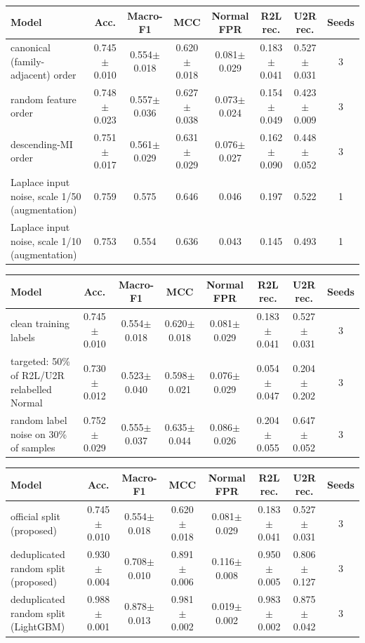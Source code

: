 \begin{tabular}{lccccccc}
\toprule
Model & Acc. & Macro-F1 & MCC & Normal FPR & R2L rec. & U2R rec. & Seeds \\
\midrule
canonical (family-adjacent) order & 0.745$\pm$0.010 & 0.554$\pm$0.018 & 0.620$\pm$0.018 & 0.081$\pm$0.029 & 0.183$\pm$0.041 & 0.527$\pm$0.031 & 3 \\
random feature order & 0.748$\pm$0.023 & 0.557$\pm$0.036 & 0.627$\pm$0.038 & 0.073$\pm$0.024 & 0.154$\pm$0.049 & 0.423$\pm$0.009 & 3 \\
descending-MI order & 0.751$\pm$0.017 & 0.561$\pm$0.029 & 0.631$\pm$0.029 & 0.076$\pm$0.027 & 0.162$\pm$0.090 & 0.448$\pm$0.052 & 3 \\
Laplace input noise, scale 1/50 (augmentation) & 0.759 & 0.575 & 0.646 & 0.046 & 0.197 & 0.522 & 1 \\
Laplace input noise, scale 1/10 (augmentation) & 0.753 & 0.554 & 0.636 & 0.043 & 0.145 & 0.493 & 1 \\
\bottomrule
\end{tabular}

\begin{tabular}{lccccccc}
\toprule
Model & Acc. & Macro-F1 & MCC & Normal FPR & R2L rec. & U2R rec. & Seeds \\
\midrule
clean training labels & 0.745$\pm$0.010 & 0.554$\pm$0.018 & 0.620$\pm$0.018 & 0.081$\pm$0.029 & 0.183$\pm$0.041 & 0.527$\pm$0.031 & 3 \\
targeted: 50\% of R2L/U2R relabelled Normal & 0.730$\pm$0.012 & 0.523$\pm$0.040 & 0.598$\pm$0.021 & 0.076$\pm$0.029 & 0.054$\pm$0.047 & 0.204$\pm$0.202 & 3 \\
random label noise on 30\% of samples & 0.752$\pm$0.029 & 0.555$\pm$0.037 & 0.635$\pm$0.044 & 0.086$\pm$0.026 & 0.204$\pm$0.055 & 0.647$\pm$0.052 & 3 \\
\bottomrule
\end{tabular}

\begin{tabular}{lccccccc}
\toprule
Model & Acc. & Macro-F1 & MCC & Normal FPR & R2L rec. & U2R rec. & Seeds \\
\midrule
official split (proposed) & 0.745$\pm$0.010 & 0.554$\pm$0.018 & 0.620$\pm$0.018 & 0.081$\pm$0.029 & 0.183$\pm$0.041 & 0.527$\pm$0.031 & 3 \\
deduplicated random split (proposed) & 0.930$\pm$0.004 & 0.708$\pm$0.010 & 0.891$\pm$0.006 & 0.116$\pm$0.008 & 0.950$\pm$0.005 & 0.806$\pm$0.127 & 3 \\
deduplicated random split (LightGBM) & 0.988$\pm$0.001 & 0.878$\pm$0.013 & 0.981$\pm$0.002 & 0.019$\pm$0.002 & 0.983$\pm$0.002 & 0.875$\pm$0.042 & 3 \\
\bottomrule
\end{tabular}

